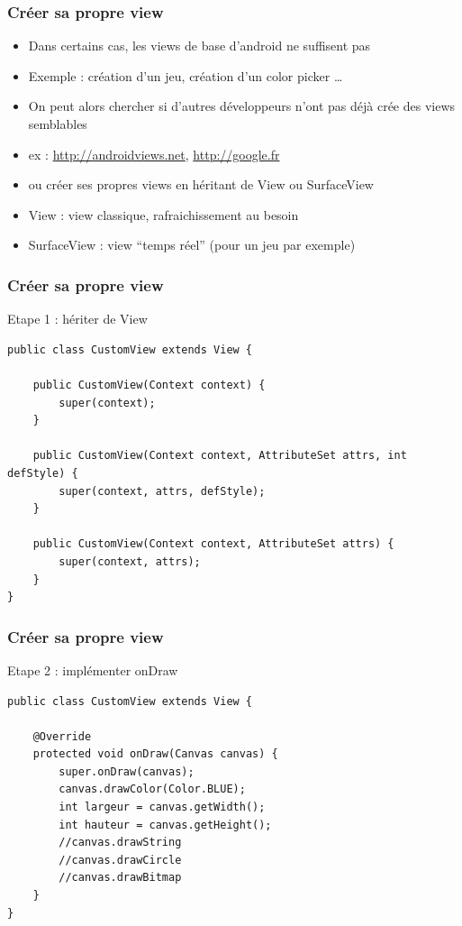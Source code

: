 \documentclass{beamer}
\begin{document}
\begin{frame}[fragile]
\frametitle{Créer sa propre view}
\begin{itemize}
  \item Dans certains cas, les views de base d'android ne suffisent pas
  \item Exemple : création d'un jeu, création d'un color picker \ldots
  \item On peut alors chercher si d'autres développeurs n'ont pas déjà crée des views semblables
  \item ex : \url{http://androidviews.net}, \url{http://google.fr}
  \item ou créer ses propres views en héritant de View ou SurfaceView
  \item View : view classique, rafraichissement au besoin
  \item SurfaceView : view ``temps réel'' (pour un jeu par exemple)
\end{itemize}
\end{frame}
\begin{frame}[fragile]
\frametitle{Créer sa propre view}
Etape 1 : hériter de View
\begin{lstlisting}
public class CustomView extends View {

    public CustomView(Context context) {
        super(context);
    }

    public CustomView(Context context, AttributeSet attrs, int defStyle) {
        super(context, attrs, defStyle);
    }

    public CustomView(Context context, AttributeSet attrs) {
        super(context, attrs);
    }
}
 \end{lstlisting}
\end{frame}
\begin{frame}[fragile]
\frametitle{Créer sa propre view}
Etape 2 : implémenter onDraw
\begin{lstlisting}
public class CustomView extends View {

    @Override
    protected void onDraw(Canvas canvas) {
        super.onDraw(canvas);
        canvas.drawColor(Color.BLUE);
        int largeur = canvas.getWidth();
        int hauteur = canvas.getHeight();
        //canvas.drawString
        //canvas.drawCircle
        //canvas.drawBitmap
    }
}
\end{lstlisting}
\end{frame}
\end{document}
